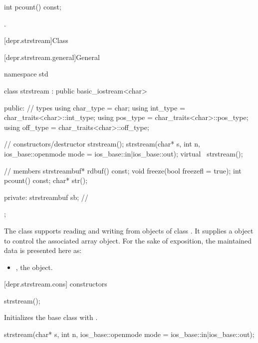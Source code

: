 %
\begin{itemdecl}
int pcount() const;
\end{itemdecl}

\begin{itemdescr}
\pnum
\returns
{}.
\end{itemdescr}

[depr.strstream]{Class }

[depr.strstream.general]{General}

%
\begin{codeblock}
namespace std {
  class strstream
    : public basic_iostream<char> {
  public:
    // types
    using char_type = char;
    using int_type  = char_traits<char>::int_type;
    using pos_type  = char_traits<char>::pos_type;
    using off_type  = char_traits<char>::off_type;

    // constructors/destructor
    strstream();
    strstream(char* s, int n,
              ios_base::openmode mode = ios_base::in|ios_base::out);
    virtual ~strstream();

    // members
    strstreambuf* rdbuf() const;
    void freeze(bool freezefl = true);
    int pcount() const;
    char* str();

  private:
    strstreambuf sb;            // \expos
  };
}
\end{codeblock}

\pnum
The class
supports reading and writing from objects of class
.
It supplies a
object to control the associated array object.
For the sake of exposition, the maintained data is presented here as:

\begin{itemize}
\item
{}, the  object.
\end{itemize}

[depr.strstream.cons]{ constructors}

%
\begin{itemdecl}
strstream();
\end{itemdecl}

\begin{itemdescr}
\pnum
\effects
Initializes the base class with .
\end{itemdescr}

%
\begin{itemdecl}
strstream(char* s, int n,
          ios_base::openmode mode = ios_base::in|ios_base::out);
\end{itemdecl}

